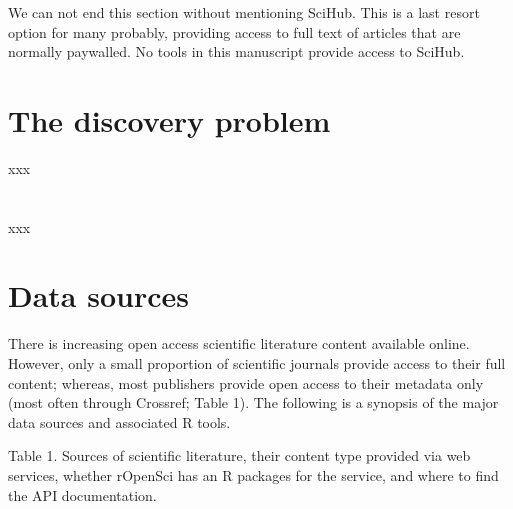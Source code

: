 \documentclass[author-year, review, 11pt]{components/elsarticle} %
\begin{document}
We can not end this section without mentioning SciHub. This is a last
resort option for many probably, providing access to full text of
articles that are normally paywalled. No tools in this manuscript
provide access to SciHub.

\hypertarget{the-discovery-problem}{%
\section{The discovery problem}\label{the-discovery-problem}}

xxx

\hypertarget{section}{%
\section{}\label{section}}

xxx

\hypertarget{data-sources}{%
\section{Data sources}\label{data-sources}}

There is increasing open access scientific literature content available
online. However, only a small proportion of scientific journals provide
access to their full content; whereas, most publishers provide open
access to their metadata only (most often through Crossref; Table 1).
The following is a synopsis of the major data sources and associated R
tools.

\newpage

Table 1. Sources of scientific literature, their content type provided
via web services, whether rOpenSci has an R packages for the service,
and where to find the API documentation.
\end{document}
